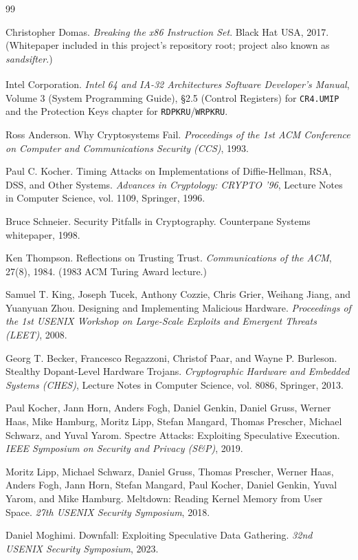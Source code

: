\documentclass[11pt]{article}
\newcommand{\code}[1]{\texttt{#1}}
\begin{document}
\begin{thebibliography}{99}

Christopher Domas.
\emph{Breaking the x86 Instruction Set}.
Black Hat USA, 2017.
(Whitepaper included in this project's repository root;
project also known as \emph{sandsifter}.)

Intel Corporation.
\emph{Intel\textsuperscript{\textregistered} 64 and IA-32 Architectures
Software Developer's Manual}, Volume 3 (System Programming Guide),
\S2.5 (Control Registers) for \code{CR4.UMIP} and the Protection Keys
chapter for \code{RDPKRU}/\code{WRPKRU}.

Ross Anderson.
Why Cryptosystems Fail.
\emph{Proceedings of the 1st ACM Conference on Computer and
Communications Security (CCS)}, 1993.

Paul C. Kocher.
Timing Attacks on Implementations of Diffie-Hellman, RSA, DSS, and Other
Systems.
\emph{Advances in Cryptology: CRYPTO '96}, Lecture Notes in Computer
Science, vol. 1109, Springer, 1996.

Bruce Schneier.
Security Pitfalls in Cryptography.
Counterpane Systems whitepaper, 1998.

Ken Thompson.
Reflections on Trusting Trust.
\emph{Communications of the ACM}, 27(8), 1984. (1983 ACM Turing Award
lecture.)

Samuel T. King, Joseph Tucek, Anthony Cozzie, Chris Grier, Weihang Jiang,
and Yuanyuan Zhou.
Designing and Implementing Malicious Hardware.
\emph{Proceedings of the 1st USENIX Workshop on Large-Scale Exploits and
Emergent Threats (LEET)}, 2008.

Georg T. Becker, Francesco Regazzoni, Christof Paar, and Wayne P. Burleson.
Stealthy Dopant-Level Hardware Trojans.
\emph{Cryptographic Hardware and Embedded Systems (CHES)}, Lecture Notes
in Computer Science, vol. 8086, Springer, 2013.

Paul Kocher, Jann Horn, Anders Fogh, Daniel Genkin, Daniel Gruss, Werner
Haas, Mike Hamburg, Moritz Lipp, Stefan Mangard, Thomas Prescher, Michael
Schwarz, and Yuval Yarom.
Spectre Attacks: Exploiting Speculative Execution.
\emph{IEEE Symposium on Security and Privacy (S\&P)}, 2019.

Moritz Lipp, Michael Schwarz, Daniel Gruss, Thomas Prescher, Werner Haas,
Anders Fogh, Jann Horn, Stefan Mangard, Paul Kocher, Daniel Genkin, Yuval
Yarom, and Mike Hamburg.
Meltdown: Reading Kernel Memory from User Space.
\emph{27th USENIX Security Symposium}, 2018.

Daniel Moghimi.
Downfall: Exploiting Speculative Data Gathering.
\emph{32nd USENIX Security Symposium}, 2023.

\end{thebibliography}
\end{document}
